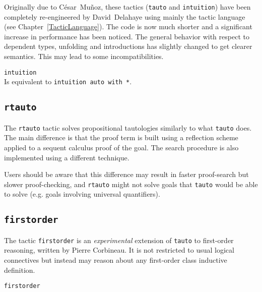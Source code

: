 \begin{coq_example*}
Originally due to C{\'e}sar~Mu{\~n}oz, these tactics ({\tt tauto} and {\tt intuition})
have been completely re-engineered by David~Delahaye using mainly the tactic
language (see Chapter~\ref{TacticLanguage}). The code is now much shorter and
a significant increase in performance has been noticed. The general behavior
with respect to dependent types, unfolding and introductions has
slightly changed to get clearer semantics. This may lead to some
incompatibilities.

\begin{Variants}
\item {\tt intuition}\\
  Is equivalent to {\tt intuition auto with *}.
\end{Variants}



\subsection{\tt rtauto
\label{rtauto}}

The {\tt rtauto} tactic solves propositional tautologies similarly to what {\tt tauto} does. The main difference is that the proof term is built using a reflection scheme applied to a sequent calculus proof of the goal. The search procedure is also implemented using a different technique.

Users should be aware that this difference may result in faster proof-search but  slower proof-checking, and {\tt rtauto} might not solve goals that {\tt tauto} would be able to solve (e.g. goals involving universal quantifiers).

\subsection{{\tt firstorder}
\label{firstorder}}

The tactic \texttt{firstorder} is an {\it experimental} extension of
\texttt{tauto} to
first-order reasoning, written by Pierre Corbineau.
It is not restricted to usual logical connectives but
instead may reason about any first-order class inductive definition.

\begin{Variants}
 \item {\tt firstorder {\tac}}


\end{Variants}
\end{coq_example*}

